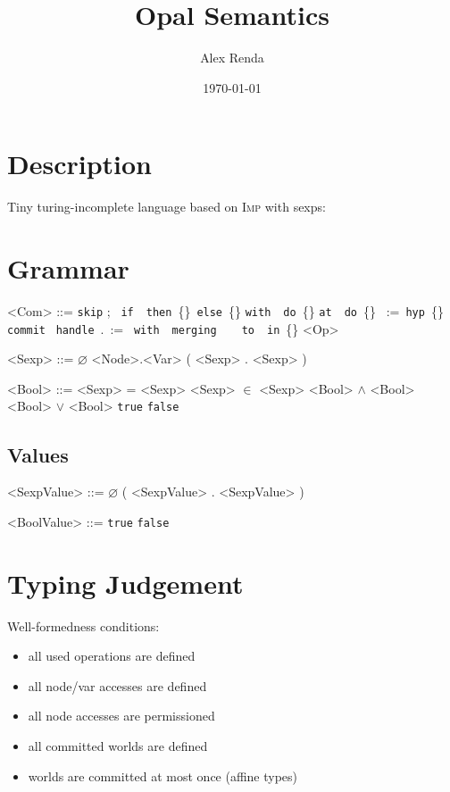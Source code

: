 \documentclass{article}
\title{Opal Semantics}
\author{Alex Renda}
\date{\today}
\newcommand{\skipcom}{\texttt{skip}}
\newcommand{\seqcom}[2]{#1;\ #2}
\newcommand{\ifcom}[3]{\texttt{if}\ #1\ \texttt{then}\ \{#2\}\ \texttt{else}\ \{#3\}}
\newcommand{\withcom}[2]{\texttt{with}\ #1\ \texttt{do}\ \{#2\}}
\newcommand{\atcom}[2]{\texttt{at}\ #1\ \texttt{do}\ \{#2\}}
\newcommand{\hypcom}[2]{#1\ :=\ \texttt{hyp}\ \{#2\}}
\newcommand{\commitcom}[1]{\texttt{commit}\ #1}
\newcommand{\handlecom}[9]{\texttt{handle}\ #1.#2\ := \textit{#3}\ \texttt{with}\ #4\ \texttt{merging}\ #5\ #6\ #7\ \texttt{to}\ #8\ \texttt{in}\ \{#9\}}
\newcommand{\true}{\texttt{true}}
\newcommand{\false}{\texttt{false}}
\newcommand{\imp}{\textsc{Imp}\xspace}
\begin{document}
\maketitle

\section{Description}

Tiny turing-incomplete language based on \imp with sexps:

\section{Grammar}

\begin{grammar}
<Com> ::= \skipcom
\alt \seqcom{}{}
\alt \ifcom{}{\synt{Com}}{}
\alt \withcom{}{}
\alt \atcom{}{}
\alt \hypcom{}{}
\alt \commitcom{}
\alt \handlecom{}{}{}{}{\synt{Var}}{\synt{Var}}{\synt{Var}}{\synt{Sexp}}{\synt{Com}}
\alt <Op>

<Sexp> ::= $\varnothing$
\alt <Node>.<Var>
\alt ( <Sexp> . <Sexp> )

<Bool> ::= <Sexp> = <Sexp>
\alt <Sexp> $\in$ <Sexp>
\alt <Bool> $\land$ <Bool>
\alt <Bool> $\lor$ <Bool>
\alt \true
\alt \false

\end{grammar}

\subsection{Values}

\begin{grammar}
<SexpValue> ::= $\varnothing$
\alt ( <SexpValue> . <SexpValue> )

<BoolValue> ::= \true
\alt \false
\end{grammar}

\section{Typing Judgement}

Well-formedness conditions:
\begin{itemize}
\item all used operations are defined
\item all node/var accesses are defined
\item all node accesses are permissioned
\item all committed worlds are defined
\item worlds are committed at most once (affine types)
\end{itemize}
\end{document}
